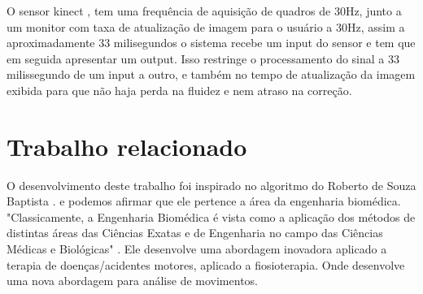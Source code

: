     O sensor kinect \cite{microsoftResearch}, tem uma frequência de
  aquisição de quadros de 30Hz, junto a um monitor com taxa de atualização de imagem
  para o usuário a 30Hz, assim a aproximadamente 33 milisegundos o
  sistema recebe um input do sensor e tem que em seguida apresentar um output. Isso
   restringe o processamento do sinal a 33 milissegundo de um input a outro, e
  também no tempo de atualização da imagem exibida para que não haja perda na
  fluidez e nem atraso na correção.

  \section{Trabalho relacionado}
  \label{Sec:MetCondTCC}
    O desenvolvimento deste trabalho foi inspirado no algoritmo do Roberto de Souza Baptista \cite{roberto}.
  e podemos afirmar que ele pertence a área da engenharia biomédica. "Classicamente,
  a Engenharia Biomédica é vista como a aplicação dos métodos de distintas áreas
  das Ciências Exatas e de Engenharia no campo das Ciências Médicas e
  Biológicas" \cite{engenhariaBiomedica}. Ele desenvolve uma abordagem
  inovadora aplicado a terapia de  doenças/acidentes motores, aplicado a
   fiosioterapia. Onde desenvolve uma nova abordagem para análise de movimentos.

